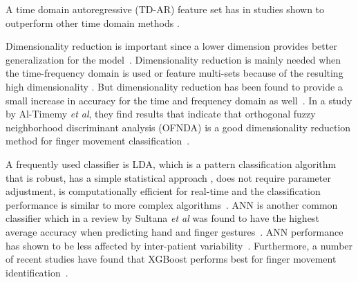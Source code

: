 A time domain autoregressive (TD-AR) feature set has in studies shown to outperform other time domain methods \cite{al-timemyClassificationFingerMovements2013}\cite{schemeElectromyogramPatternRecognition2011}.

Dimensionality reduction is important since a lower dimension provides better generalization for the model~\cite{englehartClassificationMyoelectricSignal1999}. Dimensionality reduction is mainly needed when the time-frequency domain is used or feature multi-sets because of the resulting high dimensionality \cite{phinyomarkEMGFeatureEvaluation2013}. But dimensionality reduction has been found to provide a small increase in accuracy for the time and frequency domain as well~\cite{phinyomarkEMGFeatureEvaluation2013}. 
In a study by Al-Timemy \textit{et al}, they find results that indicate that orthogonal fuzzy neighborhood discriminant analysis (OFNDA) is a good dimensionality reduction method for finger movement classification~\cite{al-timemyClassificationFingerMovements2013}.

A frequently used classifier is LDA, which is a pattern classification algorithm that is robust, has a simple statistical approach \cite{lorrainInfluenceTrainingSet2011}, does not require parameter adjustment, is computationally efficient for real-time \cite{khanSelectionFeaturesClassifiers2020} and the classification performance is similar to more complex algorithms~\cite{phinyomarkEMGFeatureEvaluation2013}\cite{phinyomarkFeatureReductionSelection2012}\cite{schemeElectromyogramPatternRecognition2011}. ANN is another common classifier which in a review by Sultana \textit{et al} was found to have the highest average accuracy when predicting hand and finger gestures~\cite{sultanaSystematicReviewSurface2023}. ANN performance has shown to be less affected by inter-patient variability~\cite{leeElectromyogramBasedClassificationHand2021}. Furthermore, a number of recent studies have found that XGBoost performs best for finger movement identification~\cite{hristovClassificationIndividualCombined2022}\cite{kumarMachineLearningBasedFramework2022}.


